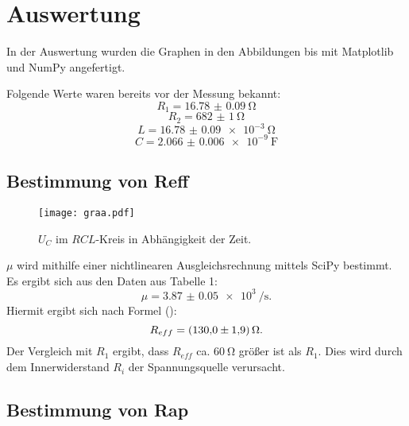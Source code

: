 \section{Auswertung}
\label{sec:Auswertung}
In der Auswertung wurden die Graphen in den Abbildungen  bis  mit Matplotlib \cite{matplotlib} und NumPy \cite{numpy} angefertigt.


Folgende Werte waren bereits vor der Messung bekannt:
\begin{displaymath}
R_1 = \SI{16.78(9)}{\ohm}
\end{displaymath}
\begin{displaymath}
R_2 = \SI{682(1)}{\ohm}
\end{displaymath}
\begin{displaymath}
L = \SI{16.78(9)e-3}{\ohm}
\end{displaymath}
\begin{displaymath}
C = \SI{2.066(6)e-9}{\farad}
\end{displaymath}

\subsection{Bestimmung von Reff}
\begin{figure}[H]
	\centering
	\caption{$U_C$ im $RCL$-Kreis in Abhängigkeit der Zeit.}
	\texttt{[image: graa.pdf]}
	\label{fig:graa}
\end{figure}

$\mu$ wird mithilfe einer nichtlinearen Ausgleichsrechnung mittels SciPy \cite{scipy} bestimmt. Es ergibt sich aus den Daten aus Tabelle 1:
\begin{displaymath}
\mu = \SI{3.87(5)e3}{\per\second}\text{.}
\end{displaymath}
Hiermit ergibt sich nach Formel ():
\begin{displaymath}
R_{eff} = \SI{130 \pm 1.9}{\ohm}\text{.}
\end{displaymath}
Der Vergleich mit $R_1$ ergibt, dass $R_{eff}$ ca. $\SI{60}{\ohm}$ größer ist als $R_1$. Dies wird durch dem Innerwiderstand $R_i$ der Spannungsquelle verursacht.

\subsection{Bestimmung von Rap}

